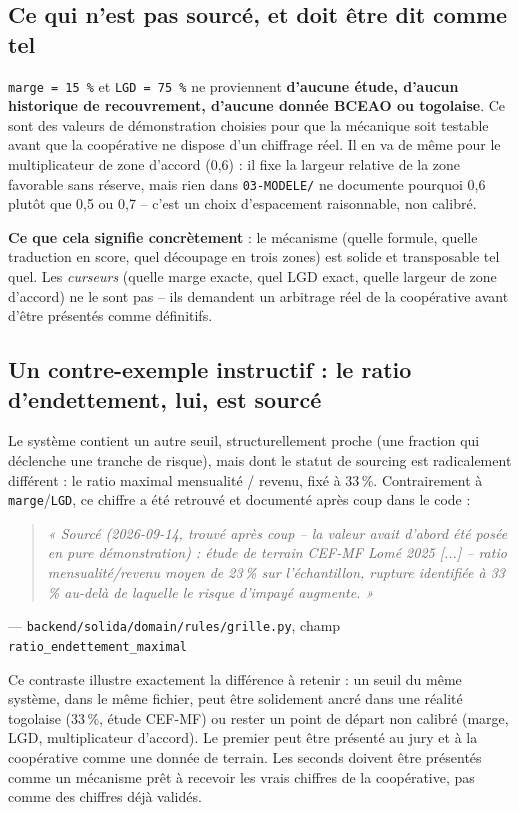 \documentclass[11pt,a4paper]{article}
\begin{document}
\subsection{Ce qui n'est pas sourcé, et doit être dit comme tel}

\texttt{marge = 15\,\%} et \texttt{LGD = 75\,\%} ne proviennent \textbf{d'aucune étude, d'aucun
historique de recouvrement, d'aucune donnée BCEAO ou togolaise}. Ce sont des valeurs de
démonstration choisies pour que la mécanique soit testable avant que la coopérative ne dispose
d'un chiffrage réel. Il en va de même pour le multiplicateur de zone d'accord (0,6) : il fixe la
largeur relative de la zone favorable sans réserve, mais rien dans \texttt{03-MODELE/} ne documente
pourquoi 0,6 plutôt que 0,5 ou 0,7 -- c'est un choix d'espacement raisonnable, non calibré.

\textbf{Ce que cela signifie concrètement} : le mécanisme (quelle formule, quelle traduction en
score, quel découpage en trois zones) est solide et transposable tel quel. Les \emph{curseurs}
(quelle marge exacte, quel LGD exact, quelle largeur de zone d'accord) ne le sont pas -- ils
demandent un arbitrage réel de la coopérative avant d'être présentés comme définitifs.

\subsection{Un contre-exemple instructif : le ratio d'endettement, lui, est sourcé}

Le système contient un autre seuil, structurellement proche (une fraction qui déclenche une
tranche de risque), mais dont le statut de sourcing est radicalement différent : le ratio maximal
mensualité / revenu, fixé à 33\,\%. Contrairement à \texttt{marge}/\texttt{LGD}, ce chiffre a été
retrouvé et documenté après coup dans le code :

\begin{quote}\itshape
« Sourcé (2026-09-14, trouvé après coup -- la valeur avait d'abord été posée en pure
démonstration) : étude de terrain CEF-MF Lomé 2025 [...] -- ratio mensualité/revenu moyen de 23\,\%
sur l'échantillon, rupture identifiée à 33\,\% au-delà de laquelle le risque d'impayé augmente. »
\end{quote}
\hfill --- \texttt{backend/solida/domain/rules/grille.py}, champ \texttt{ratio\_endettement\_maximal}

Ce contraste illustre exactement la différence à retenir : un seuil du même système, dans le même
fichier, peut être solidement ancré dans une réalité togolaise (33\,\%, étude CEF-MF) ou rester un
point de départ non calibré (marge, LGD, multiplicateur d'accord). Le premier peut être présenté au jury et
à la coopérative comme une donnée de terrain. Les seconds doivent être présentés comme un mécanisme
prêt à recevoir les vrais chiffres de la coopérative, pas comme des chiffres déjà validés.
\end{document}
